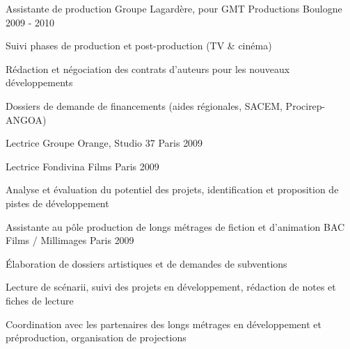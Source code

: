 \begin{cventries}
  \cventry
    {Assistante de production} %
    {Groupe Lagardère, pour GMT Productions} %
    {Boulogne} %
    {2009 - 2010} %
    {
      \begin{cvitems} %
        \item {Suivi phases de production et post-production (TV \& cinéma)}
        \item {Rédaction et négociation des contrats d’auteurs pour les nouveaux développements}
        \item {Dossiers de demande de financements (aides régionales, SACEM, Procirep-ANGOA)}
      \end{cvitems}
    }

  \cventry
    {Lectrice} %
    {Groupe Orange, Studio 37} %
    {Paris} %
    {2009} %
    {}
    \vspace{-0.35cm}

  \cventry
    {Lectrice} %
    {Fondivina Films} %
    {Paris} %
    {2009} %
    {
      \begin{cvitems} %
        \item {Analyse et évaluation du potentiel des projets, identification et proposition de pistes de développement}
      \end{cvitems}
    }

  \cventry
    {Assistante au pôle production de longs métrages de fiction et d’animation} %
    {BAC Films / Millimages} %
    {Paris} %
    {2009} %
    {
      \begin{cvitems} %
        \item {Élaboration de dossiers artistiques et de demandes de subventions}
        \item {Lecture de scénarii, suivi des projets en développement, rédaction de notes et fiches de lecture}
        \item {Coordination avec les partenaires des longs métrages en développement et préproduction, organisation de projections}
      \end{cvitems}
    }


\end{cventries}
